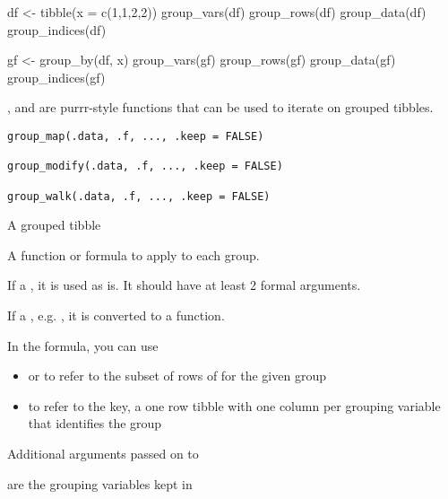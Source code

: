 \documentclass[a4paper]{book}
\begin{document}
%
\begin{Examples}
\begin{ExampleCode}
df <- tibble(x = c(1,1,2,2))
group_vars(df)
group_rows(df)
group_data(df)
group_indices(df)

gf <- group_by(df, x)
group_vars(gf)
group_rows(gf)
group_data(gf)
group_indices(gf)
\end{ExampleCode}
\end{Examples}
%
\begin{Description}
\strong{[Experimental]}

,  and  are purrr-style functions that can
be used to iterate on grouped tibbles.
\end{Description}
%
\begin{Usage}
\begin{verbatim}
group_map(.data, .f, ..., .keep = FALSE)

group_modify(.data, .f, ..., .keep = FALSE)

group_walk(.data, .f, ..., .keep = FALSE)
\end{verbatim}
\end{Usage}
%
\begin{Arguments}
\begin{ldescription}
\item[\code{.data}] A grouped tibble

\item[\code{.f}] A function or formula to apply to each group.

If a , it is used as is. It should have at least 2 formal arguments.

If a , e.g. , it is converted to a function.

In the formula, you can use
\begin{itemize}

\item{}  or  to refer to the subset of rows of 
for the given group
\item{}  to refer to the key, a one row tibble with one column per grouping variable
that identifies the group

\end{itemize}


\item[\code{...}] Additional arguments passed on to 

\item[\code{.keep}] are the grouping variables kept in 
\end{ldescription}
\end{Arguments}
\end{document}
